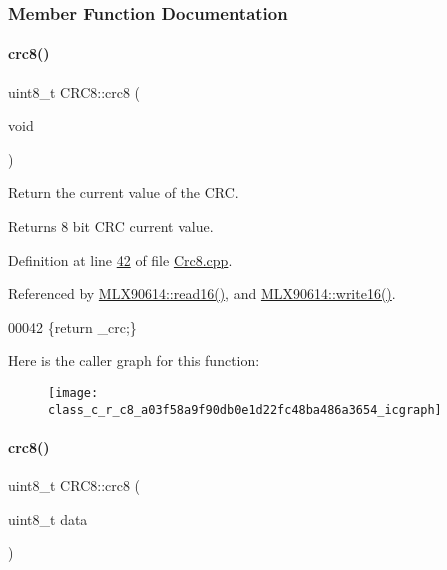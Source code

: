 \subsubsection{Member Function Documentation}
\mbox{\label{class_c_r_c8_a03f58a9f90db0e1d22fc48ba486a3654}} 
\paragraph{\texorpdfstring{crc8()}{crc8()}\hspace{0.1cm}{\footnotesize\ttfamily [1/2]}}
{\footnotesize\ttfamily uint8\+\_\+t C\+R\+C8\+::crc8 (\begin{DoxyParamCaption}\item[{void}]{ }\end{DoxyParamCaption})}



Return the current value of the C\+RC. 

\begin{DoxyReturn}{Returns}
8 bit C\+RC current value. 
\end{DoxyReturn}


Definition at line \mbox{\hyperlink{_crc8_8cpp_source_l00042}{42}} of file \mbox{\hyperlink{_crc8_8cpp_source}{Crc8.\+cpp}}.



Referenced by \mbox{\hyperlink{_m_l_x90614_8cpp_source_l00270}{M\+L\+X90614\+::read16()}}, and \mbox{\hyperlink{_m_l_x90614_8cpp_source_l00314}{M\+L\+X90614\+::write16()}}.


\begin{DoxyCode}
00042 \{\textcolor{keywordflow}{return} \_crc;\}
\end{DoxyCode}
Here is the caller graph for this function\+:\nopagebreak
\begin{figure}[H]
\begin{center}
\leavevmode
\texttt{[image: class\_c\_r\_c8\_a03f58a9f90db0e1d22fc48ba486a3654\_icgraph]}
\end{center}
\end{figure}
\mbox{\label{class_c_r_c8_a80f09a2c108b6b2ba0fcfed3e6f9544b}} 
\paragraph{\texorpdfstring{crc8()}{crc8()}\hspace{0.1cm}{\footnotesize\ttfamily [2/2]}}
{\footnotesize\ttfamily uint8\+\_\+t C\+R\+C8\+::crc8 (\begin{DoxyParamCaption}\item[{uint8\+\_\+t}]{data }\end{DoxyParamCaption})}



